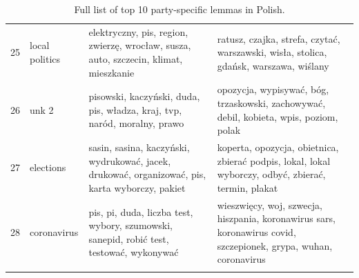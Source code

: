 \documentclass{article}
\begin{document}
\begin{otherlanguage}{polish}
\begin{longtable}{p{2cm}p{2cm}p{5cm}p{5cm}}
				25 &           local politics &                            elektryczny, pis, region, zwierzę, wrocław, susza, auto, szczecin, klimat, mieszkanie &                                   ratusz, czajka, strefa, czytać, warszawski, wisła, stolica, gdańsk, warszawa, wiślany \\
				26 &                    unk 2 &                                         pisowski, kaczyński, duda, pis, władza, kraj, tvp, naród, moralny, prawo &                                  opozycja, wypisywać, bóg, trzaskowski, zachowywać, debil, kobieta, wpis, poziom, polak \\
				27 &                elections &                  sasin, sasina, kaczyński, wydrukować, jacek, drukować, organizować, pis, karta wyborczy, pakiet &                     koperta, opozycja, obietnica, zbierać podpis, lokal, lokal wyborczy, odbyć, zbierać, termin, plakat \\
				28 &              coronavirus &                          pis, pi, duda, liczba test, wybory, szumowski, sanepid, robić test, testować, wykonywać &        wieszwięcy, woj, szwecja, hiszpania, koronawirus sars, koronawirus covid, szczepionek, grypa, wuhan, coronavirus \\
				
				\bottomrule
				
				\caption{Full list of top 10 party-specific lemmas in Polish.}
				\label{tab:party_phrases_pol_full}

		\end{longtable}
		

\clearpage

\begin{longtable}{p{2cm}p{2cm}p{5cm}p{5cm}}
	

\end{longtable}
\end{otherlanguage}
\end{document}
